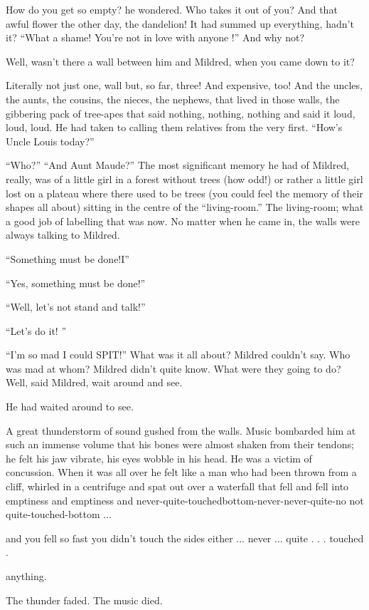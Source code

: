 \documentclass[11pt,openany]{book}
\begin{document}
How do you get so empty? he wondered. Who takes it out of you? And that awful flower the other day, the dandelion! It had summed up everything, hadn't it? ``What a shame! You're not in love with anyone !'' And why not?

Well, wasn't there a wall between him and Mildred, when you came down to it?

Literally not just one, wall but, so far, three! And expensive, too! And the uncles, the aunts, the cousins, the nieces, the nephews, that lived in those walls, the gibbering pack of tree-apes that said nothing, nothing, nothing and said it loud, loud, loud. He had taken to calling them relatives from the very first. ``How's Uncle Louis today?''

``Who?'' ``And Aunt Maude?'' The most significant memory he had of Mildred, really, was of a little girl in a forest without trees (how odd!) or rather a little girl lost on a plateau where there used to be trees (you could feel the memory of their shapes all about) sitting in the centre of the ``living-room.'' The living-room; what a good job of labelling that was now. No matter when he came in, the walls were always talking to Mildred.

``Something must be done!I''

``Yes, something must be done!''

``Well, let's not stand and talk!''

``Let's do it! ''

``I'm so mad I could SPIT!'' What was it all about? Mildred couldn't say. Who was mad at whom? Mildred didn't quite know. What were they going to do? Well, said Mildred, wait around and see.

He had waited around to see.

A great thunderstorm of sound gushed from the walls. Music bombarded him at such an immense volume that his bones were almost shaken from their tendons; he felt his jaw vibrate, his eyes wobble in his head. He was a victim of concussion. When it was all over he felt like a man who had been thrown from a cliff, whirled in a centrifuge and spat out over a waterfall that fell and fell into emptiness and emptiness and never-quite-touchedbottom-never-never-quite-no not quite-touched-bottom ...

and you fell so fast you didn't touch the sides either ... never ... quite . . . touched .

anything.

The thunder faded. The music died.
\end{document}
